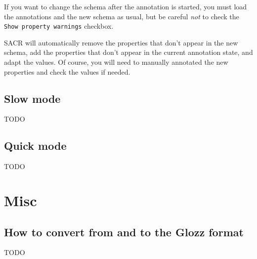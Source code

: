 \documentclass[12pt]{article}
\begin{document}
If you want to change the schema after the annotation is started, you must
load the annotations and the new schema as usual, but be careful \emph{not}
to check the \verb|Show property warnings| checkbox.

SACR will automatically remove the properties that don't appear in the new
schema, add the properties that don't appear in the current annotation state,
and adapt the values.  Of course, you will need to manually annotated the new
properties and check the values if needed.



 \subsection{Slow mode}

TODO

 \subsection{Quick mode}

\label{sec:quick-mode}

TODO

 \section{Misc}

 \subsection{How to convert from and to the Glozz format}

TODO


\end{document}
